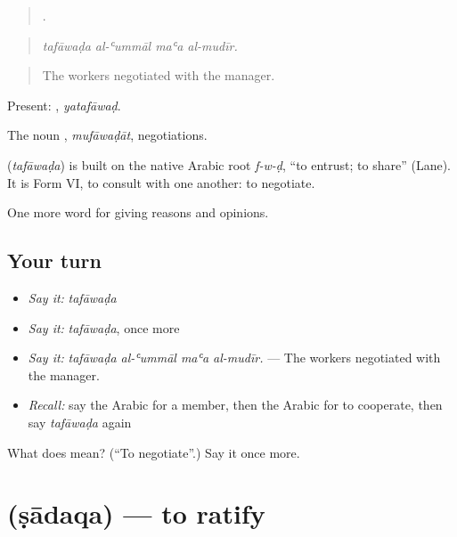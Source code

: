 \begin{quote}
   .
\end{quote}

\begin{quote}
\emph{tafāwaḍa al-ʿummāl maʿa al-mudīr.}
\end{quote}

\begin{quote}
The workers negotiated with the manager.
\end{quote}

Present: , \emph{yatafāwaḍ}.

The noun , \emph{mufāwaḍāt}, negotiations.

\begin{cousinweb}
\textbf{} (\emph{tafāwaḍa}) is built on the native Arabic root \emph{f-w-ḍ}, \textquotedblleft{}to entrust; to share\textquotedblright{} (Lane). It is Form VI, to consult with one another: to negotiate.
\end{cousinweb}

\begin{grammarlens}[title={What you've built}]
One more word for giving reasons and opinions.
\end{grammarlens}

\subsection*{Your turn}
\begin{itemize}
\raggedright
  \item \emph{Say it:} \emph{tafāwaḍa}
  \item \emph{Say it:} \emph{tafāwaḍa}, once more
  \item \emph{Say it:} \emph{tafāwaḍa al-ʿummāl maʿa al-mudīr.} — The workers negotiated with the manager.
  \item \emph{Recall:} say the Arabic for a member, then the Arabic for to cooperate, then say \emph{tafāwaḍa} again
\end{itemize}

\begin{tcolorbox}[breakable,colback=teal!4,colframe=teal!35!black,title={Before you move on}]
What does  mean? (\textquotedblleft{}To negotiate\textquotedblright{}.) Say it once more.
\end{tcolorbox}
\section[\texorpdfstring{\ar{صادق} (ṣādaqa)}{صادق (ṣādaqa)}]{ (ṣādaqa) — to ratify}

